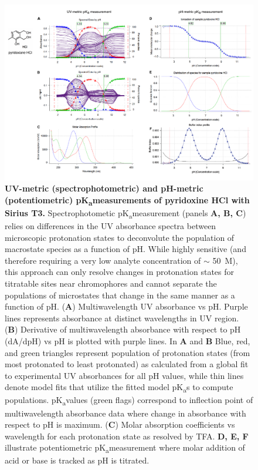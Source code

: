 \documentclass[9pt,lineno]{elife}
\newcommand{\pKa}{pK\textsubscript{a}}
\begin{document}
\begin{figure}
\includegraphics[width=1.00\linewidth]{figures/UVmetric_vs_pHmetric_pKa_figure}
\caption{{\bf  UV-metric (spectrophotometric) and pH-metric (potentiometric) \pKa measurements of pyridoxine HCl with Sirius T3.} 
Spectrophotometic \pKa measurement (panels \textbf{A, B, C}) relies on differences in the UV absorbance spectra between microscopic protonation states to deconvolute the population of macrostate species as a function of pH.
While highly sensitive (and therefore requiring a very low analyte concentration of $\sim$ 50~\micro M), this approach can only resolve changes in protonation states for titratable sites near chromophores and cannot separate the populations of microstates that change in the same manner as a function of pH. 
(\textbf{A}) Multiwavelength UV absorbance vs pH. Purple lines represents absorbance at distinct wavelengths in UV region.
(\textbf{B}) Derivative of multiwavelength absorbance with respect to pH (dA/dpH) vs pH is plotted with purple lines. 
In \textbf{A} and \textbf{B} Blue, red, and green triangles represent population of protonation states (from most protonated to least protonated) as calculated from a global fit to experimental UV absorbances for all pH values, while thin lines denote model fits that utilize the fitted model \pKa s to compute populations.
\pKa values (green flags) correspond to inflection point of multiwavelength absorbance data where change in absorbance with respect to pH is maximum. 
(\textbf{C}) Molar absorption coefficients vs wavelength for each protonation state as resolved by TFA. 
\textbf{D, E, F} illustrate potentiometric \pKa measurement where molar addition of acid or base is tracked as pH is titrated.
}
\end{figure}
\end{document}
